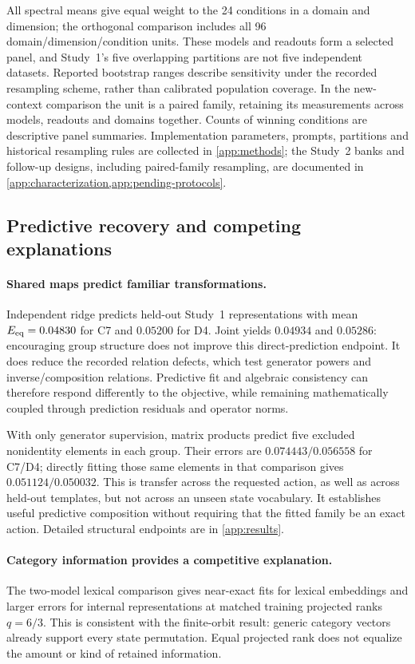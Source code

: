 All spectral means give equal weight to the 24 conditions in a domain and dimension; the orthogonal comparison includes all 96 domain/dimension/condition units. These models and readouts form a selected panel, and Study~1's five overlapping partitions are not five independent datasets. Reported bootstrap ranges describe sensitivity under the recorded resampling scheme, rather than calibrated population coverage. In the new-context comparison the unit is a paired family, retaining its measurements across models, readouts and domains together. Counts of winning conditions are descriptive panel summaries. Implementation parameters, prompts, partitions and historical resampling rules are collected in \cref{app:methods}; the Study~2 banks and follow-up designs, including paired-family resampling, are documented in \cref{app:characterization,app:pending-protocols}.

\subsection{Predictive recovery and competing explanations}
\label{sec:characterization}
\paragraph{Shared maps predict familiar transformations.}
Independent ridge predicts held-out Study~1 representations with mean $E_{\mathrm{eq}}=0.04830$ for C7 and $0.05200$ for D4. Joint yields $0.04934$ and $0.05286$: encouraging group structure does not improve this direct-prediction endpoint. It does reduce the recorded relation defects, which test generator powers and inverse/composition relations. Predictive fit and algebraic consistency can therefore respond differently to the objective, while remaining mathematically coupled through prediction residuals and operator norms.

With only generator supervision, matrix products predict five excluded nonidentity elements in each group. Their errors are $0.074443/0.056558$ for C7/D4; directly fitting those same elements in that comparison gives $0.051124/0.050032$. This is transfer across the requested action, as well as across held-out templates, but not across an unseen state vocabulary. It establishes useful predictive composition without requiring that the fitted family be an exact action. Detailed structural endpoints are in \cref{app:results}.

\paragraph{Category information provides a competitive explanation.}
The two-model lexical comparison gives near-exact fits for lexical embeddings and larger errors for internal representations at matched training projected ranks $q=6/3$. This is consistent with the finite-orbit result: generic category vectors already support every state permutation. Equal projected rank does not equalize the amount or kind of retained information.

